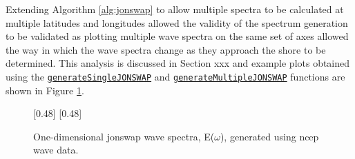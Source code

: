 Extending Algorithm \ref{alg:jonswap} to allow multiple spectra to be calculated at multiple latitudes and longitudes allowed the validity of the spectrum generation to be validated as plotting multiple wave spectra on the same set of axes allowed the way in which the wave spectra change as they approach the shore to be determined. This analysis is discussed in Section xxx and example plots obtained using the \href{https://github.com/JNSRYA006/sar-parameter-extraction-pipeline/blob/main/functions/waveSpectra/generateSingleJONSWAP.m}{\lstinline{generateSingleJONSWAP}} and \href{https://github.com/JNSRYA006/sar-parameter-extraction-pipeline/blob/main/functions/waveSpectra/generateMultipleJONSWAP.m}{\lstinline{generateMultipleJONSWAP}} functions are shown in Figure \ref{fig:systemDesign.1DSampleWaveSpectrum}. 


\begin{figure} [H]
    \centering
    [0.48\linewidth]{
        \resizebox{\linewidth}{!}{}
    }
    [0.48\linewidth]{
        \resizebox{\linewidth}{!}{}
    }
    \caption{One-dimensional \acs{jonswap} wave spectra, E($\omega$), generated using \acs{ncep} wave data.}
    \label{fig:systemDesign.1DSampleWaveSpectrum}
\end{figure}

